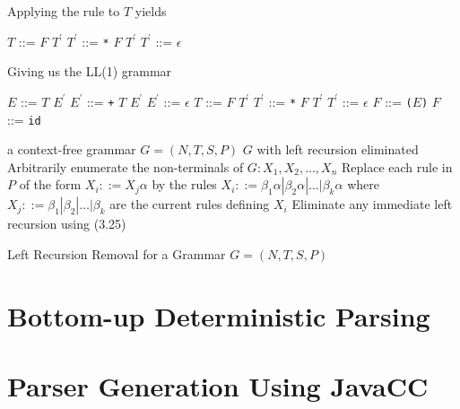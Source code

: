 \documentclass[8pt,a4paper,compress]{beamer}
\newcommand{\mm}[1]{$#1$}
\newcommand{\expo}[2]{$#1^{#2}$}
\newenvironment{spaced}
{
\smallskip
\hspace{.5cm}
\begin{minipage}[c]{\textwidth}
}
{
\end{minipage}
\smallskip
}
\begin{document}
\begin{frame}[fragile]
\pause

Applying the rule to $T$ yields

\text{ }
\begin{spaced}
\begin{production}
\mm{T}  ::= \mm{F} \expo{T}{\prime}
\expo{T}{\prime} ::= \lstinline{*} \mm{F} \expo{T}{\prime}
\expo{T}{\prime} ::= \mm{\epsilon}
\end{production}
\end{spaced}

\pause

Giving us the LL(1) grammar

\text{ }
\begin{spaced}
\begin{production}
\mm{E}  ::= \mm{T} \expo{E}{\prime}
\expo{E}{\prime} ::= \lstinline{+} \mm{T} \expo{E}{\prime}
\expo{E}{\prime} ::= \mm{\epsilon}
\mm{T}  ::= \mm{F} \expo{T}{\prime}
\expo{T}{\prime} ::= \lstinline{*} \mm{F} \expo{T}{\prime}
\expo{T}{\prime} ::= \mm{\epsilon}
\mm{F}  ::= \lstinline{(}\mm{E}\lstinline{)}
\mm{F}  ::= \lstinline{id}
\end{production}
\end{spaced}
\end{frame}

\begin{frame}[fragile]
\pause

\begin{algorithm}[H]
\begin{algorithmic}
\REQUIRE a context-free grammar $G=(N,T,S,P)$
\ENSURE $G$ with left recursion eliminated
\STATE Arbitrarily enumerate the non-terminals of $G: X_1, X_2, \dots, X_n$
\STATE Replace each rule in $P$ of the form $X_i::= X_j\alpha$ by the rules $X_i ::= \beta_1\alpha | \beta_2\alpha | \dots | \beta_k\alpha$ where $X_j ::= \beta_1 | \beta_2 | \dots | \beta_k$ are the current rules defining $X_i$
\STATE Eliminate any immediate left recursion using (3.25)
\ENDFOR
\ENDFOR
\end{algorithmic}
\caption{Left Recursion Removal for a Grammar $G=(N,T,S,P)$}
\end{algorithm}
\end{frame}

\begin{frame}[fragile]
\pause

\end{frame}

\section{Bottom-up Deterministic Parsing}
\begin{frame}[fragile]
\pause

\end{frame}

\section{Parser Generation Using JavaCC}
\begin{frame}[fragile]
\pause

\end{frame}
\end{document}
